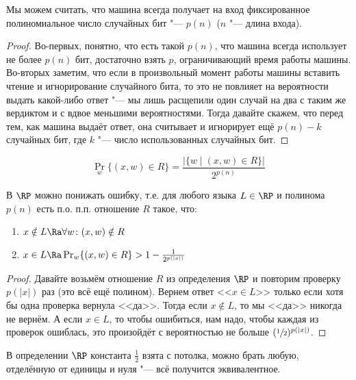 	\begin{assertion}
		Мы можем считать, что машина всегда получает на вход фиксированное полиномиальное число случайных бит "--- $p(n)$ ($n$ "--- длина входа).
	\end{assertion}
	\begin{proof}
		Во-первых, понятно, что есть такой $p(n)$, что машина всегда использует не более $p(n)$ бит, достаточно взять $p$, ограничивающий время работы машины.
		Во-вторых заметим, что если в произвольный момент работы машины вставить чтение и игнорирование случайного бита, то это не повлияет на вероятности
		выдать какой-либо ответ "--- мы лишь расщепили один случай на два с таким же вердиктом и с вдвое меньшими вероятностями.
		Тогда давайте скажем, что перед тем, как машина выдаёт ответ, она считывает и игнорирует ещё $p(n)-k$ случайных бит, где $k$ "--- число использованных случайных бит.
	\end{proof}
	\begin{conseq}
		\[ \Pr_w \{ (x, w) \in R \} = \frac{|\{ w \mid (x, w) \in R \}|}{2^{p(n)}} \]
	\end{conseq}

	\begin{theorem}
		В $\RP$ можно понижать ошибку, т.е. для любого языка $L \in \RP$ и полинома $p(n)$ есть п.о. п.п. отношение $R$ такое, что:
		\begin{enumerate}
			\item $x \notin L \Ra \forall w \colon (x, w) \notin R$
			\item $x \in L \Ra \Pr_w \{ (x, w) \in R \} > 1 - \frac 1{2^{p(|x|)}}$
		\end{enumerate}
	\end{theorem}
	\begin{proof}
		Давайте возьмём отношение $R$ из определения $\RP$ и повторим проверку $p(|x|)$ раз (это всё ещё полином).
		Вернем ответ <<$x \in L$>> только если хотя бы одна проверка вернула <<да>>.
		Тогда если $x \notin L$, то мы <<да>> никогда не вернём.
		А если $x \in L$, то чтобы ошибиться, нам надо, чтобы каждая из проверок ошиблась,
		это произойдёт с вероятностью не больше $(\sfrac12)^{p(|x|)}$.
	\end{proof}
	\begin{conseq}
		В определении $\RP$ константа $\frac 12$ взята с потолка, можно брать любую, отделённую от единицы и нуля "--- всё получится эквивалентное.
	\end{conseq}

